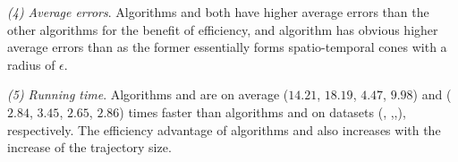 \sstab\emph{(4) Average errors}. {Algorithms \cist and \cista both have higher average errors than the other algorithms for the benefit of efficiency, and algorithm \cista has obvious higher average errors than \cist as the former essentially forms spatio-temporal cones with a radius of $\epsilon$.}

\sstab\emph{(5) Running time}. Algorithms \cist and \cista are on average
($14.21$, $18.19$, $4.47$, $9.98$) and ($2.84$, $3.45$, $2.65$, $2.86$) times faster
than algorithms \dps and \squishe on {datasets} (\sercar, {\geolife},\mopsi,\pricar), respectively.
The efficiency advantage of algorithms \cist and \cista also increases  with the increase of the trajectory size.






